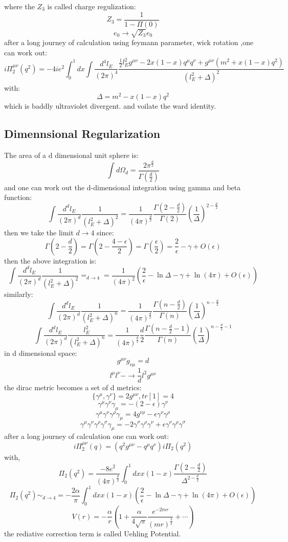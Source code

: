 where the $Z_3$ is called charge regulization:
\[Z_3=\frac{1}{1-\Pi(0)}\]
\[e_0\rightarrow \sqrt{Z_3}e_0\]
after a long journey of calculation using feymann parameter, wick rotation ,one can work out:
\[i\Pi_2^{\mu\nu}(q^2)=-4ie^2\int _0^1dx\int\frac{d^4 l_E}{(2\pi)^4}\frac{\frac{1}{2}l_E^2g^{\mu\nu}-2x(1-x)q^\mu q^\nu+g^{\mu\nu}(m^2+x(1-x)q^2)}{(l_E^2+\Delta)^2}\]
with:
\[\Delta=m^2-x(1-x)q^2\]
which is baddly ultraviolet divergent. and voilate the ward identity.\par
\subsection{Dimennsional Regularization}
The area of a d dimensional unit sphere is:
\[\int d\Omega_d=\frac{2\pi^{\frac{d}{2}}}{\Gamma(\frac{d}{2})}\]
and one can work out the d-dimensional integration using gamma and beta function:
\[\int \frac{d^dl_E}{(2\pi)^d}\frac{1}{(l_E^2+\Delta)^2}=\frac{1}{(4\pi)^{\frac{d}{2}}}\frac{\Gamma(2-\frac{d}{2})}{\Gamma(2)}(\frac{1}{\Delta})^{2-\frac{d}{2}}\]
then we take the limit $d\rightarrow 4$ since:
\[\Gamma(2-\frac{d}{2})=\Gamma(2-\frac{4-\epsilon}{2})=\Gamma(\frac{\epsilon}{2})=\frac{2}{\epsilon}-\gamma+O(\epsilon)\]
then the above integration is:
\[\int \frac{d^dl_E}{(2\pi)^d}\frac{1}{(l_E^2+\Delta)^2}=_{d\rightarrow 4}=\frac{1}{(4\pi)^2}(\frac{2}{\epsilon}-\ln \Delta-\gamma+\ln(4\pi)+O(\epsilon))\]
similarly:
\[\int \frac{d^dl_E}{(2\pi)^d}\frac{1}{(l_E^2+\Delta)^n}=\frac{1}{(4\pi)^{\frac{d}{2}}}\frac{\Gamma(n-\frac{d}{2})}{\Gamma(n)}(\frac{1}{\Delta})^{n-\frac{d}{2}}\]
\[\int \frac{d^dl_E}{(2\pi)^d}\frac{l_E^2}{(l_E^2+\Delta)^n}=\frac{1}{(4\pi)^{\frac{d}{2}}}\frac{d}{2}\frac{\Gamma(n-\frac{d}{2}-1)}{\Gamma(n)}(\frac{1}{\Delta})^{n-\frac{d}{2}-1}\]
in d dimensional space:
\[g^{\mu\nu}g_{\nu\mu}=d\]
\[l^\mu l^\nu-\rightarrow \frac{1}{d}l^2g^{\mu\nu}\]
the dirac metric becomes a set of d metrics:
\[\{\gamma^\mu,\gamma^\nu\}=2g^{\mu\nu},tr[1]=4\]
\[\gamma^\mu\gamma^\nu\gamma_\mu=-(2-\epsilon)\gamma^\nu\]
\[\gamma^\mu\gamma^\nu\gamma^\rho\gamma_\mu=4g^{\nu\rho}-\epsilon\gamma^\nu\gamma^\rho\]
\[\gamma^\mu\gamma^\nu\gamma^\rho\gamma^\sigma\gamma_\mu=-2\gamma^\sigma\gamma^\rho\gamma^\nu+\epsilon \gamma^\nu\gamma^\rho\gamma^\sigma\]
after a long journey of calculation one can work out:
\[i\Pi_2^{\mu\nu}(q)=(q^2g^{\mu\nu}-q^\mu q^\nu)i\Pi_2(q^2)\]
with,
\[\Pi_2(q^2)=\frac{-8e^2}{(4\pi)^{\frac{d}{2}}}\int_0^1dx x(1-x)\frac{\Gamma(2-\frac{d}{2})}{\Delta^{2-\frac{d}{2}}}\]
\[\Pi_2(q^2)\sim_{d\rightarrow 4}=-\frac{2\alpha}{\pi}\int_0^1dx x(1-x)(\frac{2}{\epsilon}-\ln \Delta-\gamma+\ln(4\pi)+O(\epsilon))\]
\[V(r)=-\frac{\alpha}{r}(1+\frac{\alpha}{4\sqrt{\pi}}\frac{e^{-2mr}}{(mr)^{\frac{3}{2}}}+\cdots)\]
the rediative correction term is called Uehling Potential.\par
